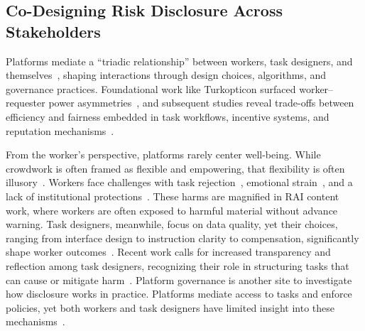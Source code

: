 \subsection{Co-Designing Risk Disclosure Across Stakeholders}
Platforms mediate a ``triadic relationship'' between workers, task designers, and themselves~\cite{fieseler_unfairness_2019}, shaping interactions through design choices, algorithms, and governance practices. Foundational work like Turkopticon surfaced worker–requester power asymmetries~\cite{irani2013turkopticon}, and subsequent studies reveal trade-offs between efficiency and fairness embedded in task workflows, incentive systems, and reputation mechanisms~\cite{ho2015incentivizing, saito2019turkscanner}.

From the worker's perspective, platforms rarely center well-being. While crowdwork is often framed as flexible and empowering, that flexibility is often  illusory~\cite{rechkemmer2022understanding, varanasi2022feeling, liang2021embracing}. Workers face challenges with task rejection~\cite{mcinnis2016taking}, emotional strain~\cite{flores2020challenges, martin2014being}, and a lack of institutional protections~\cite{salehi2018ink, silberman2018responsible}. These harms are magnified in RAI content work, where workers are often exposed to harmful material without advance warning.
Task designers, meanwhile, focus on data quality, yet their choices, ranging from interface design to instruction clarity to compensation, significantly shape worker outcomes~\cite{wu2017confusing, han2020crowd, ho2015incentivizing}. Recent work calls for increased transparency and reflection among task designers, recognizing their role in structuring tasks that can cause or mitigate harm~\cite{zheng2011task, bragg2018sprout, qian2025locating, sutherland2018sharing}. Platform governance is another site to investigate how disclosure works in practice.
Platforms mediate access to tasks and enforce policies, yet both workers and task designers have limited insight into these mechanisms~\cite{toxtli2021quantifying, whiting2019fair, gray2016crowd}. %

